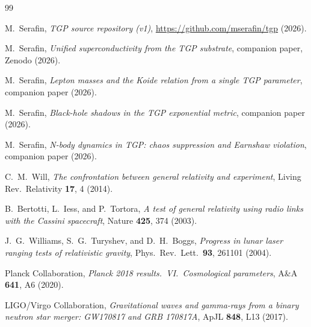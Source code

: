 \documentclass[11pt,a4paper]{article}
\begin{document}
\begin{thebibliography}{99}

M.~Serafin, \emph{TGP source repository (v1)},
\url{https://github.com/mserafin/tgp} (2026).

M.~Serafin,
\emph{Unified superconductivity from the TGP substrate},
companion paper, Zenodo (2026).

M.~Serafin,
\emph{Lepton masses and the Koide relation from a single TGP parameter},
companion paper (2026).

M.~Serafin,
\emph{Black-hole shadows in the TGP exponential metric},
companion paper (2026).

M.~Serafin,
\emph{N-body dynamics in TGP: chaos suppression and Earnshaw violation},
companion paper (2026).

C.~M.~Will,
\emph{The confrontation between general relativity and experiment},
Living Rev.\ Relativity \textbf{17}, 4 (2014).

B.~Bertotti, L.~Iess, and P.~Tortora,
\emph{A test of general relativity using radio links with the Cassini spacecraft},
Nature \textbf{425}, 374 (2003).

J.~G.~Williams, S.~G.~Turyshev, and D.~H.~Boggs,
\emph{Progress in lunar laser ranging tests of relativistic gravity},
Phys.\ Rev.\ Lett.\ \textbf{93}, 261101 (2004).

Planck Collaboration,
\emph{Planck 2018 results.\ VI.\ Cosmological parameters},
A\&A \textbf{641}, A6 (2020).

LIGO/Virgo Collaboration,
\emph{Gravitational waves and gamma-rays from a binary neutron star merger:
GW170817 and GRB 170817A}, ApJL \textbf{848}, L13 (2017).

\end{thebibliography}
\end{document}

